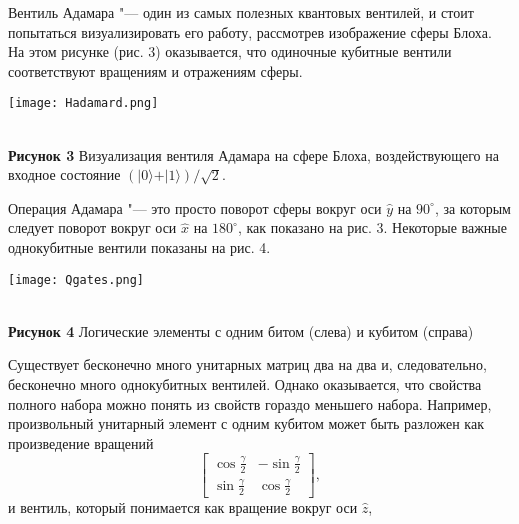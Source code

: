 \begin{multicols}{2}
{        Вентиль Адамара "--- один из самых полезных квантовых вентилей, и стоит попытаться
        визуализировать его работу, рассмотрев изображение сферы Блоха. На этом рисунке (рис. 3)
        оказывается, что одиночные кубитные вентили соответствуют вращениям и отражениям сферы.
    }\\
    \begin{flushleft}
        \begin{minipage}{0.3\textwidth}{\texttt{[image: Hadamard.png]}}
        \end{minipage}\\
        \vspace{0.3cm}
        \footnotesize{\textbf{Рисунок 3} Визуализация вентиля Адамара на сфере Блоха, воздействующего на входное состояние $(\vert0\rangle+\vert1\rangle)/\sqrt2$.}
    \end{flushleft}
    \normalsize{
        Операция Адамара "--- это просто поворот сферы вокруг оси $\hat{y}$ на $90^{\circ}$, за которым следует
        поворот вокруг оси $\hat{x}$ на $180^{\circ}$, как показано на рис. 3.
        Некоторые важные однокубитные вентили показаны на рис. 4.
    }\\
    \begin{flushleft}
        \begin{minipage}{0.3\textwidth}{\texttt{[image: Qgates.png]}}
        \end{minipage}\\
        \vspace{0.3cm}
        \footnotesize{\textbf{Рисунок 4} Логические элементы с одним битом (слева) и кубитом (справа)}
    \end{flushleft}
    \normalsize{
        Существует бесконечно много унитарных матриц два на два и, следовательно, бесконечно много однокубитных вентилей. Однако оказывается, что свойства полного набора можно понять из свойств гораздо меньшего набора. Например, 
        произвольный унитарный элемент с одним кубитом может быть разложен как произведение вращений
        \begin{equation}
            \begin{bmatrix}
                \cos{\frac{\gamma}{2}}& -\sin{\frac{\gamma}{2}}\\
                \sin{\frac{\gamma}{2}}& \cos{\frac{\gamma}{2}}
            \end{bmatrix},
        \end{equation}
        и вентиль, который понимается как вращение вокруг оси $\hat{z}$,
}
\end{multicols}
